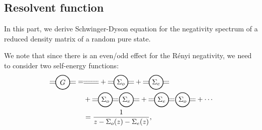 \documentclass[aps,pra,groupedaddress,twocolumn,notitlepage,superscriptaddress,10pt]{revtex4-1}
\begin{document}
\subsection{Resolvent function}

In this part, we derive Schwinger-Dyson equation for the negativity spectrum of a reduced density matrix of a random pure state.

We note that since there is an even/odd effect for the R\'enyi negativity, we need to consider two self-energy functions:
\begin{align}
    \tikz[baseline=-0.5ex]{
    \draw[densely dotted,thick] (0.35,0.05)--(0.65,0.05);
    \draw[densely dotted,thick] (-0.35,0.05)--(-0.65,0.05);
    \draw (0.35,-0.05)--(0.65,-0.05);
    \draw (-0.35,-0.05)--(-0.65,-0.05);
    \draw[thick] (0,0) circle (10pt) node[anchor=center] {$G$};
    }
    =&
   \tikz[baseline=-0.5ex]{
    \draw[densely dotted,thick] (-0.4,0.05)--(0.35,0.05);
    \draw (-0.4,-0.05)--(0.35,-0.05);
    }
    +
    \tikz[baseline=-0.5ex]{
    \draw[densely dotted,thick] (0.35,0.05)--(0.65,0.05);
    \draw[densely dotted,thick] (-0.35,0.05)--(-0.65,0.05);
    \draw (0.35,-0.05)--(0.65,-0.05);
    \draw (-0.35,-0.05)--(-0.65,-0.05);
    \draw[thick] (0,0) circle (10pt) node[anchor=center] {$\Sigma_o$};
    }
    +
    \tikz[baseline=-0.5ex]{
    \draw[densely dotted,thick] (0.35,0.05)--(0.65,0.05);
    \draw[densely dotted,thick] (-0.35,0.05)--(-0.65,0.05);
    \draw (0.35,-0.05)--(0.65,-0.05);
    \draw (-0.35,-0.05)--(-0.65,-0.05);
    \draw[thick] (0,0) circle (10pt) node[anchor=center] {$\Sigma_e$};
    }
    \nonumber \\
    &+
    \tikz[baseline=-0.5ex]{
    \draw[densely dotted,thick] (0.35,0.05)--(0.65,0.05);
    \draw[densely dotted,thick] (-0.35,0.05)--(-0.65,0.05);
    \draw (0.35,-0.05)--(0.65,-0.05);
    \draw (-0.35,-0.05)--(-0.65,-0.05);
    \draw[thick] (0,0) circle (10pt) node[anchor=center] {$\Sigma_o$};
    \draw[thick] (1.05,0) circle (10pt) node[anchor=center] {$\Sigma_e$};
    \draw[densely dotted,thick] (1.4,0.05)--(1.7,0.05);
    \draw (1.4,-0.05)--(1.7,-0.05);
    }
+
   \tikz[baseline=-0.5ex]{
    \draw[densely dotted,thick] (0.35,0.05)--(0.65,0.05);
    \draw[densely dotted,thick] (-0.35,0.05)--(-0.65,0.05);
    \draw (0.35,-0.05)--(0.65,-0.05);
    \draw (-0.35,-0.05)--(-0.65,-0.05);
    \draw[thick] (0,0) circle (10pt) node[anchor=center] {$\Sigma_e$};
    \draw[thick] (1.05,0) circle (10pt) node[anchor=center] {$\Sigma_o$};
    \draw[densely dotted,thick] (1.4,0.05)--(1.7,0.05);
    \draw (1.4,-0.05)--(1.7,-0.05);
    }
    + \cdots \nonumber \\
      &=\frac{1}{z- \Sigma_o(z) - \Sigma_e(z)},
      \label{eq:geometric}
\end{align}
\end{document}
